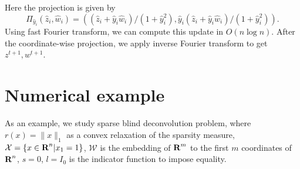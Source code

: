 \documentclass[12pt]{article}
\begin{document}
Here the projection is given by
\[
 \Pi_{\hat y_i}(\hat z_i, \hat w_i)= ((\hat z_i+ \hat y_i \hat w_i)/(1+\hat y_i^2), \hat y_i(\hat z_i+ \hat y_i \hat w_i)/(1+\hat y_i^2)).
\]
 Using fast Fourier transform, we can compute this update in $O(n\log n)$.
 After the coordinate-wise projection, we apply inverse Fourier transform to get 
 $z^{t+1}, w^{t+1}$.

\section{Numerical example}
 As an example, we study sparse blind deconvolution problem, where  
 $r(x) = \|x\|_1$ as a convex relaxation of the sparsity measure, $\mathcal X = \{x\in {\mbox{\bf R}}^n| x_1=1\}$,
 $\mathcal W$ is the embedding of ${\mbox{\bf R}}^m$ to the first $m$ coordinates of ${\mbox{\bf R}}^n$, $s=0$, $l=I_{0}$ is the indicator function to impose equality.
\end{document}
